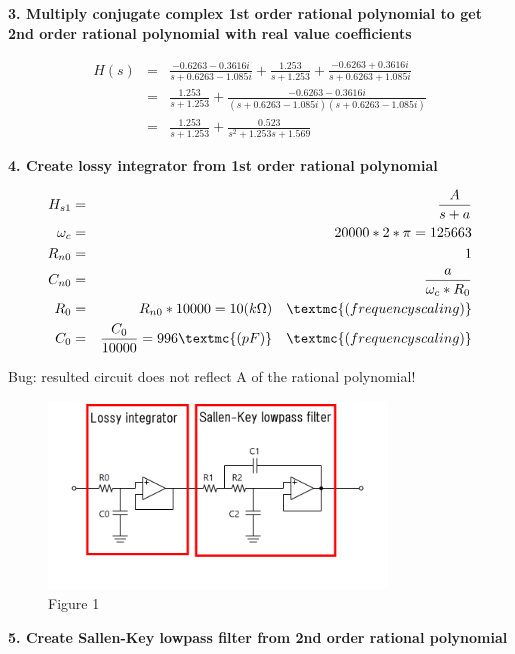 ﻿\documentclass[a4j]{jarticle}
\begin{document}
\clearpage

{\large {\bf 3. Multiply conjugate complex 1st order rational polynomial to get 2nd order rational polynomial with real value coefficients}}

\begin{eqnarray*}
H(s) &=& \frac{-0.6263-0.3616i}{s+0.6263-1.085i} + \frac{1.253}{s+1.253} + \frac{-0.6263+0.3616i}{s+0.6263+1.085i} \\
     &=& \frac{1.253}{s+1.253} + \frac{-0.6263-0.3616i}{(s+0.6263-1.085i)(s+0.6263-1.085i)} \\
     &=& \frac{1.253}{s+1.253} + \frac{0.523}{s^2+1.253s+1.569}
\end{eqnarray*}


{\large {\bf 4. Create lossy integrator from 1st order rational polynomial}}

\begin{eqnarray*}
H_{s1} &=& \frac{A}{s+a} \\
\omega_c &=& 20000 * 2 * \pi = 125663 \\
R_{n0} &=& 1 \\
C_{n0} &=& \frac{a}{\omega_c * R_0} \\
R_{0}  &=& R_{n0} * 10000 = 10 (k\Omega) \quad  \textmc{(frequency scaling)}\\
C_{0}  &=& \frac{C_0}{10000} = 996 \textmc{(pF)} \quad  \textmc{(frequency scaling)} \\
\end{eqnarray*}

Bug: resulted circuit does not reflect A of the rational polynomial! \\

\begin{figure}
    \centering
    \includegraphics[width=90mm,height=50mm,natwidth=900,natheight=500]{circuit.png} \\
Figure 1
\end{figure}

{\large {\bf 5. Create Sallen-Key lowpass filter from 2nd order rational polynomial}}
\end{document}
